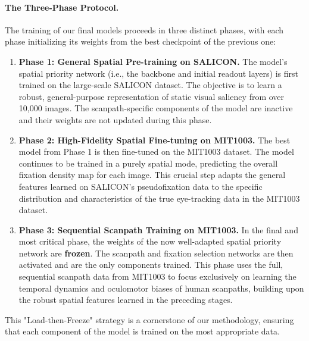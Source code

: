 \paragraph{The Three-Phase Protocol.} The training of our final models proceeds in three distinct phases, with each phase initializing its weights from the best checkpoint of the previous one:
\begin{enumerate}
    \item \textbf{Phase 1: General Spatial Pre-training on SALICON.} The model's spatial priority network (i.e., the backbone and initial readout layers) is first trained on the large-scale SALICON dataset. The objective is to learn a robust, general-purpose representation of static visual saliency from over 10,000 images. The scanpath-specific components of the model are inactive and their weights are not updated during this phase.
    \item \textbf{Phase 2: High-Fidelity Spatial Fine-tuning on MIT1003.} The best model from Phase 1 is then fine-tuned on the MIT1003 dataset. The model continues to be trained in a purely spatial mode, predicting the overall fixation density map for each image. This crucial step adapts the general features learned on SALICON's pseudofixation data to the specific distribution and characteristics of the true eye-tracking data in the MIT1003 dataset.
    \item \textbf{Phase 3: Sequential Scanpath Training on MIT1003.} In the final and most critical phase, the weights of the now well-adapted spatial priority network are \textbf{frozen}. The scanpath and fixation selection networks are then activated and are the only components trained. This phase uses the full, sequential scanpath data from MIT1003 to focus exclusively on learning the temporal dynamics and oculomotor biases of human scanpaths, building upon the robust spatial features learned in the preceding stages.
\end{enumerate}
This "Load-then-Freeze" strategy is a cornerstone of our methodology, ensuring that each component of the model is trained on the most appropriate data.
